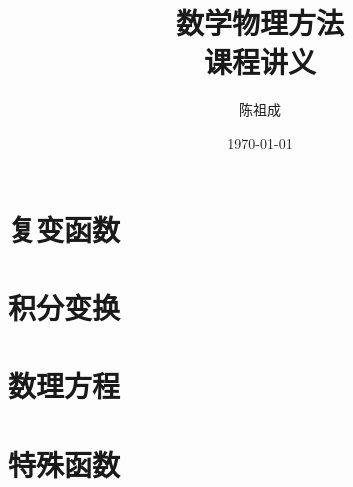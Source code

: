 \documentclass[12pt, a4paper, openright]{ctexbook}
\title{\Huge\bfseries 数学物理方法\\[0.5em]\Large 课程讲义}
\author{陈祖成}
\date{\today}
\begin{document}
%

\frontmatter
%


\begingroup
\renewcommand{\contentsname}{详细目录}
\setcounter{tocdepth}{2}
\tableofcontents
\endgroup

\mainmatter

\part{复变函数}
%

%
%
%
%
%

\part{积分变换}
%
%
%
\part{数理方程}
%
%
%
%
%
%
%
\part{特殊函数}
%
%
%
%
%
%
%
%
%

%
%    
%    
%    
%    

\printindex
\end{document}

